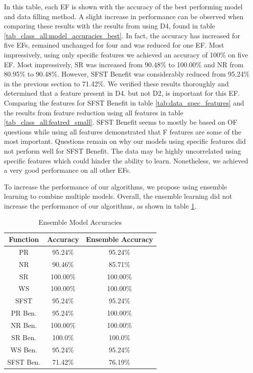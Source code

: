 \documentclass[12pt,letterpaper]{article}
\begin{document}
In this table, each \ac{EF} is shown with the accuracy of the best performing model and data filling method.
A slight increase in performance can be observed when comparing these results with the results from using D4, found in table \ref{tab_class_all:model_accuracies_best}.
In fact, the accuracy has increased for five \ac{EF}s, remained unchanged for four and was reduced for one \ac{EF}.
Most impressively, using only specific features we achieved an accuracy of 100\% on five \ac{EF}.
Most impressively, \ac{SR} was increased from 90.48\% to 100.00\% and \ac{NR} from 80.95\% to 90.48\%.
However, \ac{SFST} Benefit was considerably reduced from 95.24\% in the previous section to 71.42\%.
We verified these results thoroughly and determined that a feature present in D4. but not D2, is important for this \ac{EF}.
Comparing the features for \ac{SFST} Benefit in table \ref{tab:data_spec_features} and the results from feature reduction using all features in table \ref{tab_class_all:featred_small}.
\ac{SFST} Benefit seems to mostly be based on OF questions while using all features demonstrated that F features are some of the most important.
Questions remain on why our models using specific features did not perform well for \ac{SFST} Benefit.
The data may be highly uncorrelated using specific features which could hinder the ability to learn.
Nonetheless, we achieved a very good performance on all other \ac{EF}s.


To increase the performance of our algorithms, we propose using ensemble learning to combine multiple models.
Overall, the ensemble learning did not increase the performance of our algorithms, as shown in table \ref{tab_class_specific:class_ensemble}.
\begin{table}[H]
\centering
\begin{tabular}{|c|c|c|}
\hline
\textbf{Function} & \textbf{Accuracy} & \textbf{Ensemble Accuracy} \\
\hline
PR      & 95.24\% & 95.24\% \\
\hline
NR      & 90.46\% & 85.71\%\\
\hline
SR      & 100.00\% & 100.00\%\\
\hline
WS      & 100.00\% & 100.00\%\\
\hline
SFST    & 95.24\% & 95.24\%\\
\hline
PR Ben. & 95.24\% & 100.00\%\\
\hline
NR Ben. & 100.00\% & 100.00\%\\
\hline
SR Ben. & 100.0\% & 100.0\%\\
\hline
WS Ben. & 95.24\% & 95.24\%\\
\hline
SFST Ben. & 71.42\% & 76.19\%\\
\hline
\end{tabular}
\caption{Ensemble Model Accuracies}
\label{tab_class_specific:class_ensemble}
\end{table}
\end{document}
